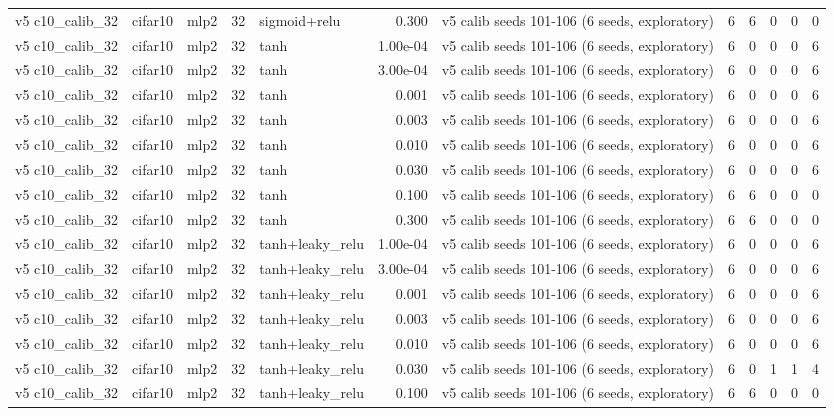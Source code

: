 \begin{table}[htbp]
{\begin{tabular}{@{}lllrlrlrrrrr@{}}
v5 c10\_calib\_32 & cifar10 & mlp2 & 32 & sigmoid+relu & 0.300 & v5 calib seeds 101-106 (6 seeds, exploratory) & 6 & 6 & 0 & 0 & 0 \\
v5 c10\_calib\_32 & cifar10 & mlp2 & 32 & tanh & 1.00e-04 & v5 calib seeds 101-106 (6 seeds, exploratory) & 6 & 0 & 0 & 0 & 6 \\
v5 c10\_calib\_32 & cifar10 & mlp2 & 32 & tanh & 3.00e-04 & v5 calib seeds 101-106 (6 seeds, exploratory) & 6 & 0 & 0 & 0 & 6 \\
v5 c10\_calib\_32 & cifar10 & mlp2 & 32 & tanh & 0.001 & v5 calib seeds 101-106 (6 seeds, exploratory) & 6 & 0 & 0 & 0 & 6 \\
v5 c10\_calib\_32 & cifar10 & mlp2 & 32 & tanh & 0.003 & v5 calib seeds 101-106 (6 seeds, exploratory) & 6 & 0 & 0 & 0 & 6 \\
v5 c10\_calib\_32 & cifar10 & mlp2 & 32 & tanh & 0.010 & v5 calib seeds 101-106 (6 seeds, exploratory) & 6 & 0 & 0 & 0 & 6 \\
v5 c10\_calib\_32 & cifar10 & mlp2 & 32 & tanh & 0.030 & v5 calib seeds 101-106 (6 seeds, exploratory) & 6 & 0 & 0 & 0 & 6 \\
v5 c10\_calib\_32 & cifar10 & mlp2 & 32 & tanh & 0.100 & v5 calib seeds 101-106 (6 seeds, exploratory) & 6 & 6 & 0 & 0 & 0 \\
v5 c10\_calib\_32 & cifar10 & mlp2 & 32 & tanh & 0.300 & v5 calib seeds 101-106 (6 seeds, exploratory) & 6 & 6 & 0 & 0 & 0 \\
v5 c10\_calib\_32 & cifar10 & mlp2 & 32 & tanh+leaky\_relu & 1.00e-04 & v5 calib seeds 101-106 (6 seeds, exploratory) & 6 & 0 & 0 & 0 & 6 \\
v5 c10\_calib\_32 & cifar10 & mlp2 & 32 & tanh+leaky\_relu & 3.00e-04 & v5 calib seeds 101-106 (6 seeds, exploratory) & 6 & 0 & 0 & 0 & 6 \\
v5 c10\_calib\_32 & cifar10 & mlp2 & 32 & tanh+leaky\_relu & 0.001 & v5 calib seeds 101-106 (6 seeds, exploratory) & 6 & 0 & 0 & 0 & 6 \\
v5 c10\_calib\_32 & cifar10 & mlp2 & 32 & tanh+leaky\_relu & 0.003 & v5 calib seeds 101-106 (6 seeds, exploratory) & 6 & 0 & 0 & 0 & 6 \\
v5 c10\_calib\_32 & cifar10 & mlp2 & 32 & tanh+leaky\_relu & 0.010 & v5 calib seeds 101-106 (6 seeds, exploratory) & 6 & 0 & 0 & 0 & 6 \\
v5 c10\_calib\_32 & cifar10 & mlp2 & 32 & tanh+leaky\_relu & 0.030 & v5 calib seeds 101-106 (6 seeds, exploratory) & 6 & 0 & 1 & 1 & 4 \\
v5 c10\_calib\_32 & cifar10 & mlp2 & 32 & tanh+leaky\_relu & 0.100 & v5 calib seeds 101-106 (6 seeds, exploratory) & 6 & 6 & 0 & 0 & 0 \\

\end{tabular}}
\end{table}
